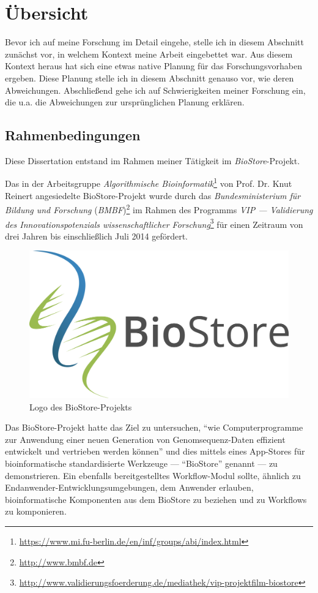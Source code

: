 \section{Übersicht}

Bevor ich auf meine Forschung im Detail eingehe, stelle ich in diesem Abschnitt zunächst vor, in welchem Kontext meine Arbeit eingebettet war. Aus diesem Kontext heraus hat sich eine etwas native Planung für das Forschungsvorhaben ergeben. Diese Planung stelle ich in diesem Abschnitt genauso vor, wie deren Abweichungen. Abschließend gehe ich auf Schwierigkeiten meiner Forschung ein, die u.a. die Abweichungen zur ursprünglichen Planung erklären.


\subsection{Rahmenbedingungen}
\label{sec:rahmenbedingungen}
Diese Dissertation entstand im Rahmen meiner Tätigkeit im \textit{BioStore}-Projekt.

Das in der Arbeitsgruppe \textit{Algorithmische Bioinformatik}\footnote{\url{https://www.mi.fu-berlin.de/en/inf/groups/abi/index.html}} von Prof. Dr. Knut Reinert angesiedelte BioStore-Projekt wurde durch das \textit{Bundesministerium für Bildung und Forschung} (\textit{BMBF})\footnote{\url{http://www.bmbf.de}} im Rahmen des Programms \textit{VIP --- Validierung des Innovationspotenzials wissenschaftlicher Forschung}\footnote{\url{http://www.validierungsfoerderung.de/mediathek/vip-projektfilm-biostore}} für einen Zeitraum von drei Jahren bis einschließlich Juli 2014 gefördert.

\begin{figure}[ht!]
  \centering
    \includegraphics[width=0.3\linewidth]{Figures/biostore-logo.png}
  \caption[BioStore-Logo]{Logo des BioStore-Projekts}
  \label{fig:biostore-logo}
\end{figure}

Das BioStore-Projekt hatte das Ziel zu untersuchen, ``wie Computerprogramme zur Anwendung einer neuen Generation von Genomsequenz-Daten effizient entwickelt und vertrieben werden können'' \citep{Reinert:tg} und dies mittels eines App-Stores für bioinformatische standardisierte Werkzeuge --- ``BioStore'' genannt --- zu demonstrieren. Ein ebenfalls bereitgestelltes Workflow-Modul sollte, ähnlich zu Endanwender-Entwicklungsumgebungen, dem Anwender erlauben, bioinformatische Komponenten aus dem BioStore zu beziehen und zu Workflows zu komponieren. \citep{Reinert:tg,Reinert:2011vl}


